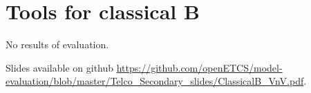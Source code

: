 \chapter{Tools for classical B}
\label{sec:classicalB}

No results of evaluation.


Slides available on github \url{https://github.com/openETCS/model-evaluation/blob/master/Telco_Secondary_slides/ClassicalB_VnV.pdf}.


